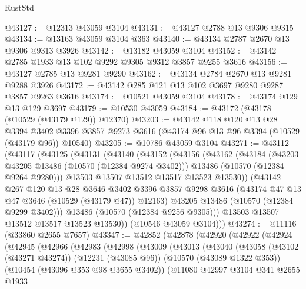 \begin{lexlean}{RustStd}
\begin{coremodule}
@43127 := @12313 @43059 @3104
@43131 := @43127 @2788 @13 @9306 @9315
@43134 := @13163 @43059 @3104 @363
@43140 := @43134 @2787 @2670 @13 @9306 @9313 @3926
@43142 := @13182 @43059 @3104
@43152 := @43142 @2785 @1933 @13 @102 @9292 @9305 @9312 @3857 @9255 @3616
@43156 := @43127 @2785 @13 @9281 @9290
@43162 := @43134 @2784 @2670 @13 @9281 @9288 @3926
@43172 := @43142 @285 @121 @13 @102 @3697 @9280 @9287 @3857 @9263 @3616
@43174 := @10521 @43059 @3104
@43178 := @43174 @129 @13 @129 @3697
@43179 := @10530 @43059
@43184 := @43172 (@43178 (@10529 (@43179 @129)) @12370)
@43203 := @43142
    @118
    @120
    @13
    @28
    @3394
    @3402
    @3396
    @3857
    @9273
    @3616
    (@43174 @96 @13 @96 @3394 (@10529 (@43179 @96)) @10540)
@43205 := @10786 @43059 @3104
@43271 := @43112
    (@43117
      (@43125
        (@43131
          (@43140
            (@43152
              (@43156
                (@43162
                  (@43184
                    (@43203 @43205 @13486 (@10570 (@12384 @9274 @3402)))
                    @13486
                    (@10570 (@12384 @9264 @9280)))
                  @13503
                  @13507
                  @13512
                  @13517
                  @13523
                  @13530))
              (@43142
                @267
                @120
                @13
                @28
                @3646
                @3402
                @3396
                @3857
                @9298
                @3616
                (@43174 @47 @13 @47 @3646 (@10529 (@43179 @47)) @12163)
                @43205
                @13486
                (@10570 (@12384 @9299 @3402)))
              @13486
              (@10570 (@12384 @9256 @9305)))
            @13503
            @13507
            @13512
            @13517
            @13523
            @13530))
        (@10546 @43059 @3104)))
@43274 := @11116 (@33860 @2655 @7657)
@43347 := @42852
    (@42878
      (@42920
        (@42922
          (@42924
            (@42945
              (@42966
                (@42983
                  (@42998
                    (@43009
                      (@43013
                        (@43040
                          (@43058
                            (@43102 (@43271 @43274))
                            (@12231 (@43085 @96))
                            (@10570 (@43089 @1322 @353))
                            (@10454 (@43096 @353 @98 @3655 @3402))
                            (@11080
                              @42997
                              @3104
                              @341
                              @2655
                              @1933

\end{coremodule}
\end{lexlean}
